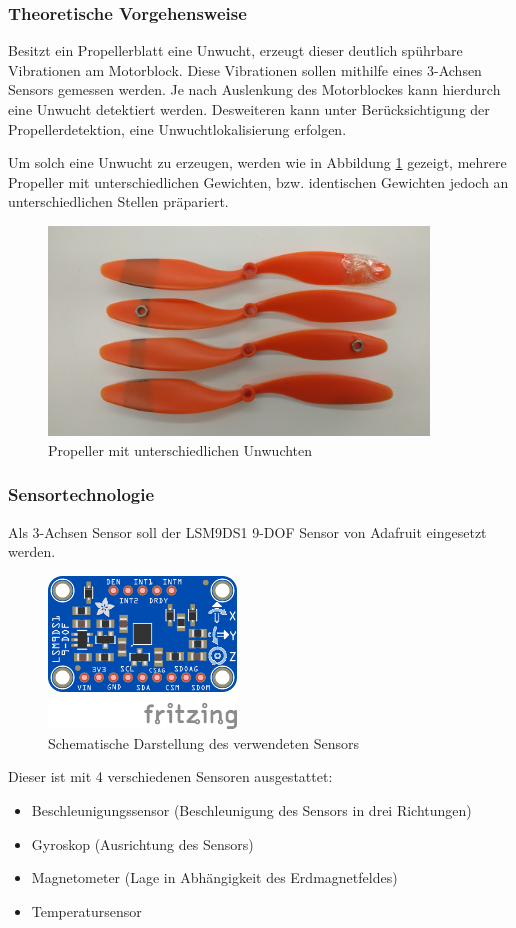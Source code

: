 \subsubsection*{Theoretische Vorgehensweise}
Besitzt ein Propellerblatt eine Unwucht, erzeugt dieser deutlich spührbare Vibrationen am Motorblock.
Diese Vibrationen sollen mithilfe eines 3-Achsen Sensors gemessen werden.
Je nach Auslenkung des Motorblockes kann hierdurch eine Unwucht detektiert werden.
Desweiteren kann unter Berücksichtigung der Propellerdetektion, eine Unwuchtlokalisierung erfolgen. 

Um solch eine Unwucht zu erzeugen, werden wie in Abbildung \ref{fig:propeller-mit-unwucht} gezeigt, mehrere Propeller mit unterschiedlichen Gewichten, bzw. identischen Gewichten jedoch an unterschiedlichen Stellen präpariert.
\begin{figure}[H]
	\centering
	\includegraphics[width=0.9\textwidth]{images/chapter/03/propeller-mit-unwucht.png}
	\caption{Propeller mit unterschiedlichen Unwuchten}
	\label{fig:propeller-mit-unwucht}
\end{figure}

\subsubsection*{Sensortechnologie}
Als 3-Achsen Sensor soll der LSM9DS1 9-DOF Sensor von Adafruit eingesetzt werden.
\begin{figure}[H]
	\centering
	\includegraphics[width=5cm]{images/chapter/03/9-dof.png}
	\caption{Schematische Darstellung des verwendeten Sensors}
\end{figure}
Dieser ist mit 4 verschiedenen Sensoren ausgestattet:
\begin{itemize}
	\item Beschleunigungssensor (Beschleunigung des Sensors in drei Richtungen)
	\item Gyroskop (Ausrichtung des Sensors)
	\item Magnetometer (Lage in Abhängigkeit des Erdmagnetfeldes)
	\item Temperatursensor
\end{itemize}

